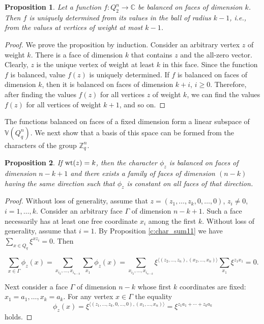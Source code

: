 \documentclass[11pt]{article}
\newtheorem{claim}{Proposition}[section]
\theoremstyle{definition}
\newcommand{\wt}{{\rm wt}}
\begin{document}
{{{\begin{claim}\label{c:weighted0}
Let a function $f:Q_2^n\rightarrow \mathbb{C}$ be balanced on faces
of dimension $k$. Then $f$ is uniquely determined from its
values in the ball of radius $k-1$, i.e., from the values at vertices of weight
at most $k-1$.
\end{claim}
\begin{proof}
We prove the proposition by induction. Consider an arbitrary vertex $z$
of weight $k$. There is a face of dimension $k$ that contains $z$ and the all-zero vector.
Clearly, $z$ is the unique vertex
of weight at least $k$ in this face.  Since the function $f$ is balanced, value
$f(z)$ is uniquely determined. If $f$ is balanced on faces of
dimension $k$, then it is balanced on faces of dimension $k+i$, $i\geq 0$.
Therefore, after finding the values $f(z)$ for all vertices $z$ of weight
$k$, we can find the values $f(z)$ for all vertices of weight $k+1$, and
so on.
\end{proof}

The functions balanced on faces of a fixed dimension form a
linear subspace of $\mathbb{V}(Q^n_q)$. We next show that a basis
of this space can be formed from the characters of the group
$\mathbb{Z}_q^n$.

\begin{claim}\label{c:weighted}
    If $\wt(z)=k$, then the character $\phi_z$ is balanced on faces of dimension $n-k+1$
    and there exists a family of faces of dimension
     $(n-k)$ having the same direction such that $\phi_z$ is constant on all faces of that direction.
\end{claim}
\begin{proof}
Without loss of generality, assume that
$z=(z_1,\ldots,z_k,0,\ldots,0)$, $z_i\ne0$, $i=1,\dots,k$.
Consider an arbitrary face $\Gamma$ of dimension $n-k+1$.  Such a face necessarily
has at least one free coordinate $x_i$ among the first $k$. Without loss of generality,
assume that $i=1$. By Proposition \ref{c:char_sum11} we have
$\sum\limits_{x\in Q_q}\xi^{x z_i}=0$. Then

\[
\sum\limits_{x\in\Gamma}\phi_z(x)=
\sum\limits_{x_{i_2},\ldots,x_{i_{n-k}}}\sum\limits_{x_1}\phi_z(x)
=\sum\limits_{x_{i_2},\ldots,x_{i_{n-k}}}\xi^{\langle(z_2,  \ldots,
z_n),(x_2,\ldots, x_n)\rangle}\sum\limits_{x_1}\xi^{z_1 x_1} = 0.
\]



Next consider a face $\Gamma$ of dimension $n-k$ whose first $k$ coordinates are fixed: $x_1=a_1,\dots, x_k=a_k$. For
any vertex $x\in \Gamma$ the equality
\[
\phi_z(x)= \xi^{\langle(z_1, \ldots, z_k,0,\ldots,0),(x_1, \ldots, x_n)\rangle}
=\xi^{z_1a_1+
 \cdots +z_k a_k}
\]
holds.
\end{proof}

}}}
\end{document}
